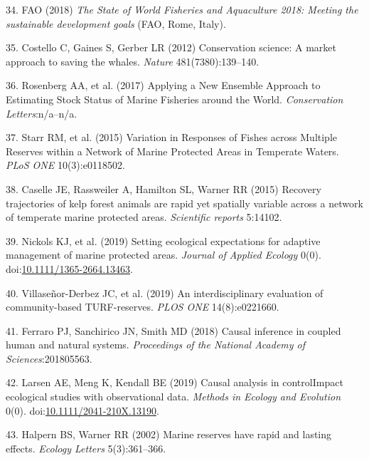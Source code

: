 \documentclass[9pt,twocolumn,twoside,lineno]{pnas-new}
\begin{document}
\leavevmode\hypertarget{ref-fao2018}{}%
34. FAO (2018) \emph{The State of World Fisheries and Aquaculture 2018:
Meeting the sustainable development goals} (FAO, Rome, Italy).

\leavevmode\hypertarget{ref-costello2012}{}%
35. Costello C, Gaines S, Gerber LR (2012) Conservation science: A
market approach to saving the whales. \emph{Nature} 481(7380):139--140.

\leavevmode\hypertarget{ref-rosenberg2017}{}%
36. Rosenberg AA, et al. (2017) Applying a New Ensemble Approach to
Estimating Stock Status of Marine Fisheries around the World.
\emph{Conservation Letters}:n/a--n/a.

\leavevmode\hypertarget{ref-starr2015}{}%
37. Starr RM, et al. (2015) Variation in Responses of Fishes across
Multiple Reserves within a Network of Marine Protected Areas in
Temperate Waters. \emph{PLoS ONE} 10(3):e0118502.

\leavevmode\hypertarget{ref-caselle2015}{}%
38. Caselle JE, Rassweiler A, Hamilton SL, Warner RR (2015) Recovery
trajectories of kelp forest animals are rapid yet spatially variable
across a network of temperate marine protected areas. \emph{Scientific
reports} 5:14102.

\leavevmode\hypertarget{ref-nickols2019}{}%
39. Nickols KJ, et al. (2019) Setting ecological expectations for
adaptive management of marine protected areas. \emph{Journal of Applied
Ecology} 0(0).
doi:\href{https://doi.org/10.1111/1365-2664.13463}{10.1111/1365-2664.13463}.

\leavevmode\hypertarget{ref-villasenor-derbez2019}{}%
40. Villaseñor-Derbez JC, et al. (2019) An interdisciplinary evaluation
of community-based TURF-reserves. \emph{PLOS ONE} 14(8):e0221660.

\leavevmode\hypertarget{ref-ferraro2018}{}%
41. Ferraro PJ, Sanchirico JN, Smith MD (2018) Causal inference in
coupled human and natural systems. \emph{Proceedings of the National
Academy of Sciences}:201805563.

\leavevmode\hypertarget{ref-larsen2019}{}%
42. Larsen AE, Meng K, Kendall BE (2019) Causal analysis in
controlImpact ecological studies with observational data. \emph{Methods
in Ecology and Evolution} 0(0).
doi:\href{https://doi.org/10.1111/2041-210X.13190}{10.1111/2041-210X.13190}.

\leavevmode\hypertarget{ref-halpern2002}{}%
43. Halpern BS, Warner RR (2002) Marine reserves have rapid and lasting
effects. \emph{Ecology Letters} 5(3):361--366.
\end{document}
